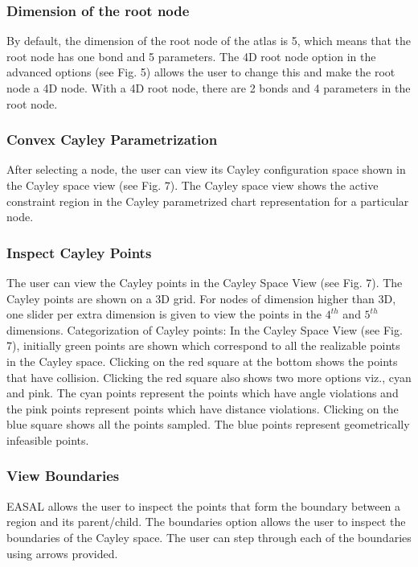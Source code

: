 \documentclass[10pt]{article}
\begin{document}
\begin{itemize}
\end{itemize}




\subsubsection{Dimension of the root node}
By default, the dimension of the root node of the atlas is 5, which means that 
the root node has one bond and 5 parameters. The 4D root node option in the 
advanced options (see Fig. 5) allows the user to change this and make the root 
node a 4D node. With a 4D root node, there are 2 bonds and 4 parameters in the
root node.



\subsubsection{Convex Cayley Parametrization}
After selecting a node, the user can view its Cayley configuration space shown in the Cayley space view
(see Fig. 7). The Cayley space view shows the active constraint region in the Cayley parametrized chart
representation for a particular node.




\subsubsection{Inspect Cayley Points}
The user can view the Cayley points in the Cayley Space View (see Fig. 7). The Cayley points are shown
on a 3D grid. For nodes of dimension higher than 3D, one slider per extra dimension is given to view the
points in the $4^{th}$ and $5^{th}$ dimensions.
Categorization of Cayley points: In the Cayley Space View (see Fig. 7), initially green points are shown
which correspond to all the realizable points in the Cayley space. Clicking on the red square at the bottom
shows the points that have collision. Clicking the red square also shows two more options viz., cyan and
pink. The cyan points represent the points which have angle violations and the pink points represent points
which have distance violations. Clicking on the blue square shows all the points sampled. The blue points
represent geometrically infeasible points.

\subsubsection{View Boundaries}
EASAL allows the user to inspect the points that form the boundary between a region and its parent/child.
The boundaries option allows the user to inspect the boundaries of the Cayley space. The user can step
through each of the boundaries using arrows provided.
\end{document}
